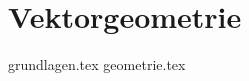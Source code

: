 \section{Vektorgeometrie}
    {grundlagen.tex}
    \raggedcolumns
    {geometrie.tex}
    \raggedcolumns